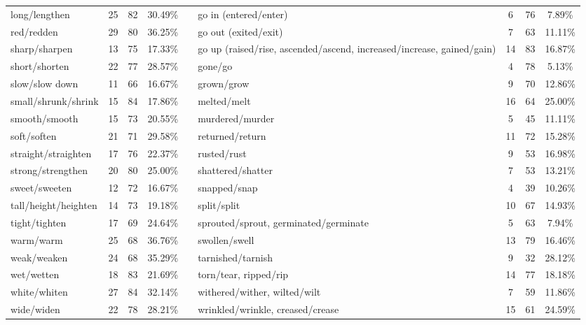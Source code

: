 \begin{tabular}{p{3cm}ccccp{3cm}ccc}
long/lengthen & 25 & 82 & 30.49\% & & go in (entered/enter) & 6 & 76 & 7.89\% \\
red/redden & 29 & 80 & 36.25\% & & go out (exited/exit) & 7 & 63 & 11.11\% \\
sharp/sharpen & 13 & 75 & 17.33\% & & go up (raised/rise, ascended/ascend, increased/increase, gained/gain) & 14 & 83 & 16.87\% \\
short/shorten & 22 & 77 & 28.57\% & & gone/go & 4 & 78 & 5.13\% \\
slow/slow down & 11 & 66 & 16.67\% & & grown/grow & 9 & 70 & 12.86\% \\
small/shrunk/shrink & 15 & 84 & 17.86\% & & melted/melt & 16 & 64 & 25.00\% \\
smooth/smooth & 15 & 73 & 20.55\% & & murdered/murder & 5 & 45 & 11.11\% \\
soft/soften & 21 & 71 & 29.58\% & & returned/return & 11 & 72 & 15.28\% \\
straight/straighten & 17 & 76 & 22.37\% & & rusted/rust & 9 & 53 & 16.98\% \\
strong/strengthen & 20 & 80 & 25.00\% & & shattered/shatter & 7 & 53 & 13.21\% \\
sweet/sweeten & 12 & 72 & 16.67\% & & snapped/snap & 4 & 39 & 10.26\% \\
tall/height/heighten & 14 & 73 & 19.18\% & & split/split & 10 & 67 & 14.93\% \\
tight/tighten & 17 & 69 & 24.64\% & & sprouted/sprout, germinated/germinate & 5 & 63 & 7.94\% \\
warm/warm & 25 & 68 & 36.76\% & & swollen/swell & 13 & 79 & 16.46\% \\
weak/weaken & 24 & 68 & 35.29\% & & tarnished/tarnish & 9 & 32 & 28.12\% \\
wet/wetten & 18 & 83 & 21.69\% & & torn/tear, ripped/rip & 14 & 77 & 18.18\% \\
white/whiten & 27 & 84 & 32.14\% & & withered/wither, wilted/wilt & 7 & 59 & 11.86\% \\
wide/widen & 22 & 78 & 28.21\% & & wrinkled/wrinkle, creased/crease & 15 & 61 & 24.59\%
\end{tabular}